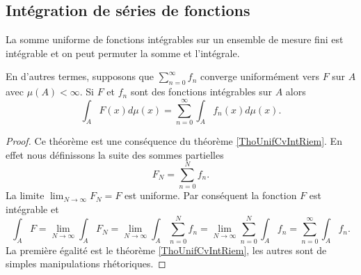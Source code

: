 \subsection{Intégration de séries de fonctions}

\begin{theorem}      \label{ThoCciOlZ}
    La somme uniforme de fonctions intégrables sur un ensemble de mesure fini est intégrable et on peut permuter la somme et l'intégrale.

    En d'autres termes, supposons que \( \sum_{n=0}^{\infty}f_n\) converge uniformément vers \( F\) sur \( A\) avec \( \mu(A)<\infty\). Si \( F\) et \( f_n\) sont des fonctions intégrables sur \( A\) alors
    \begin{equation}
        \int_AF(x)d\mu(x)=\sum_{n=0}^{\infty}\int_Af_n(x)d\mu(x).
    \end{equation}
\end{theorem}

\begin{proof}
    Ce théorème est une conséquence du théorème \ref{ThoUnifCvIntRiem}. En effet nous définissons la suite des sommes partielles
    \begin{equation}
        F_N=\sum_{n=0}^Nf_n.
    \end{equation}
    La limite \( \lim_{N\to \infty} F_N=F\) est uniforme. Par conséquent la fonction \( F\) est intégrable et
    \begin{equation}
        \int_A F=\lim_{N\to \infty} \int_AF_N=\lim_{N\to \infty} \int_A\sum_{n=0}^Nf_n=\lim_{N\to \infty} \sum_{n=0}^N\int_Af_n=\sum_{n=0}^{\infty}\int_Af_n.
    \end{equation}
    La première égalité est le théorème \ref{ThoUnifCvIntRiem}, les autres sont de simples manipulations rhétoriques.
\end{proof}

